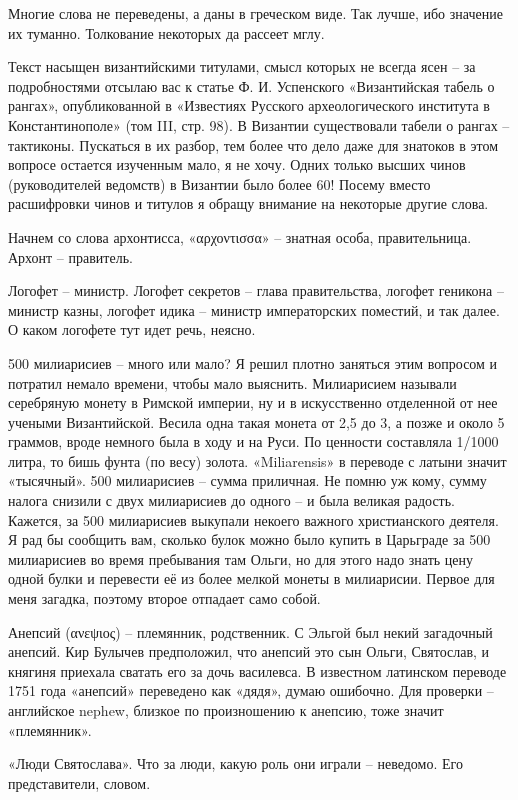 Многие слова не переведены, а даны в греческом виде. Так лучше, ибо значение их туманно. Толкование некоторых да рассеет мглу.

Текст насыщен византийскими титулами, смысл которых не всегда ясен – за подробностями отсылаю вас к статье Ф. И. Успенского «Византийская табель о рангах», опубликованной в «Известиях Русского археологического института в Константинополе» (том III, стр. 98). В Византии существовали табели о рангах – тактиконы. Пускаться в их разбор, тем более что дело даже для знатоков в этом вопросе остается изученным мало, я не хочу. Одних только высших чинов (руководителей ведомств) в Византии было более 60! Посему вместо расшифровки чинов и титулов я обращу внимание на некоторые другие слова. 

Начнем со слова архонтисса, «αρχοντισσα» – знатная особа, правительница. Архонт – правитель.

Логофет – министр. Логофет секретов – глава правительства, логофет геникона – министр казны, логофет идика – министр императорских поместий, и так далее. О каком логофете тут идет речь, неясно.

500 милиарисиев – много или мало? Я решил плотно заняться этим вопросом и потратил немало времени, чтобы мало выяснить. Милиарисием называли серебряную монету в Римской империи, ну и в искусственно отделенной от нее учеными Византийской. Весила одна такая монета от 2,5 до 3, а позже и около 5 граммов, вроде немного была в ходу и на Руси. По ценности составляла 1/1000 литра, то бишь фунта (по весу) золота. «Miliarensis» в переводе с латыни значит «тысячный». 500 милиарисиев – сумма приличная. Не помню уж кому, сумму налога снизили с двух милиарисиев до одного – и была великая радость. Кажется, за 500 милиарисиев выкупали некоего важного христианского деятеля. Я рад бы сообщить вам, сколько булок можно было купить в Царьграде за 500 милиарисиев во время пребывания там Ольги, но для этого надо знать цену одной булки и перевести её из более мелкой монеты в милиарисии. Первое для меня загадка, поэтому второе отпадает само собой.

Анепсий (ανεψιος) – племянник, родственник. С Эльгой был некий загадочный анепсий. Кир Булычев предположил, что анепсий это сын Ольги, Святослав, и княгиня приехала сватать его за дочь василевса. В известном латинском переводе 1751 года «анепсий» переведено как «дядя», думаю ошибочно. Для проверки – английское nephew, близкое по произношению к анепсию, тоже значит «племянник».

«Люди Святослава». Что за люди, какую роль они играли – неведомо. Его представители, словом.

